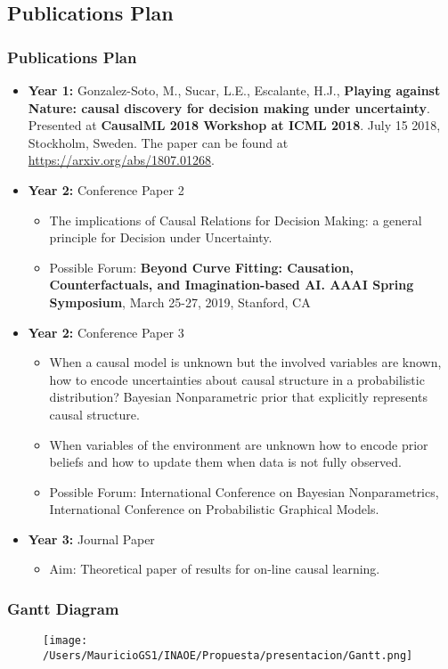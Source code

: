 \documentclass{beamer}
\theoremstyle{plain}
\begin{document}
\subsection{Publications Plan}
\begin{frame}[allowframebreaks]
\frametitle{Publications Plan}
\begin{itemize}
\item \textbf{Year 1:} Gonzalez-Soto, M., Sucar, L.E., Escalante, H.J., \textbf{Playing against Nature: causal discovery for decision making under uncertainty}. Presented at \textbf{CausalML 2018 Workshop at ICML 2018}. July 15 2018, Stockholm, Sweden. The paper can be found at \url{https://arxiv.org/abs/1807.01268}.
\item \textbf{Year 2:} Conference Paper 2 
		\begin{itemize}
		\item The implications of Causal Relations for Decision Making: a general principle for Decision under Uncertainty.
		\item Possible Forum: \textbf{Beyond Curve Fitting: Causation, Counterfactuals, and Imagination-based AI. AAAI Spring Symposium}, March 25-27, 2019, Stanford, CA
		\end{itemize}
\item \textbf{Year 2:} Conference Paper 3 
	\begin{itemize}
	\item When a causal model is unknown but the involved variables are known, how to encode uncertainties about causal structure in a probabilistic distribution? Bayesian Nonparametric prior that explicitly represents causal structure.
	\item When variables of the environment are unknown how to encode prior beliefs and how to update them when data is not fully observed.
	\item Possible Forum: International Conference on Bayesian Nonparametrics, International Conference on Probabilistic Graphical Models.
	\end{itemize}
\item \textbf{Year 3:} Journal Paper
		\begin{itemize}
			\item Aim: Theoretical paper of results for on-line causal learning.
		\end{itemize}
\end{itemize}
\end{frame}

\begin{frame}
\frametitle{Gantt Diagram}
\begin{figure}[ht]
\vskip 0.2in
\begin{center}
\texttt{[image: /Users/MauricioGS1/INAOE/Propuesta/presentacion/Gantt.png]}
\end{center}
\vskip -0.2in
\end{figure}
\end{frame}
\end{document}
